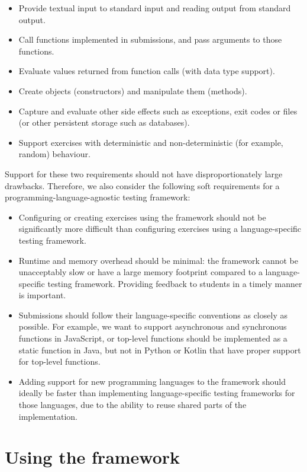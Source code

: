 \documentclass[../main]{subfiles}
\begin{document}
\begin{itemize}[noitemsep]
    \item Provide textual input to standard input and reading output from standard output.
    \item Call functions implemented in submissions, and pass arguments to those functions.
    \item Evaluate values returned from function calls (with data type support).
    \item Create objects (constructors) and manipulate them (methods).
    \item Capture and evaluate other side effects such as exceptions, exit codes or files (or other persistent storage such as databases).
    \item Support exercises with deterministic and non-deterministic (for example, random) behaviour.
\end{itemize}

Support for these two requirements should not have disproportionately large drawbacks.
Therefore, we also consider the following soft requirements for a programming-language-agnostic testing framework:

\begin{itemize}
    \item Configuring or creating exercises using the framework should not be significantly more difficult than configuring exercises using a language-specific testing framework.
    \item Runtime and memory overhead should be minimal: the framework cannot be unacceptably slow or have a large memory footprint compared to a language-specific testing framework.
    Providing feedback to students in a timely manner is important.
    \item Submissions should follow their language-specific conventions as closely as possible.
    For example, we want to support asynchronous and synchronous functions in JavaScript, or top-level functions should be implemented as a static function in Java, but not in Python or Kotlin that have proper support for top-level functions.
    \item Adding support for new programming languages to the framework should ideally be faster than implementing language-specific testing frameworks for those languages, due to the ability to reuse shared parts of the implementation.
\end{itemize}

\section{Using the framework}\label{sec:tested1-using-the-framework}
\end{document}
